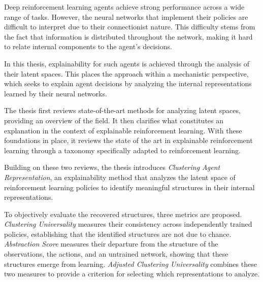 \cleartorightpage
\ifprintversion\hbox{}\thispagestyle{empty}\newpage\fi
\centeredmargins
{}
\thispagestyle{empty}
\nolinenumbers
\label{chap:abstract}
\begin{center}
  {\LARGE\bfseries \ThesisTitle\par}
  \medskip
  {\large \ThesisAuthor\par}
\end{center}
\bigskip

Deep reinforcement learning agents achieve strong performance across a wide range of tasks.
However, the neural networks that implement their policies are difficult to interpret due to their connectionist nature.
This difficulty stems from the fact that information is distributed throughout the network, making it hard to relate internal components to the agent's decisions.

In this thesis, explainability for such agents is achieved through the analysis of their latent spaces.
This places the approach within a mechanistic perspective, which seeks to explain agent decisions by analyzing the internal representations learned by their neural networks.

The thesis first reviews state-of-the-art methods for analyzing latent spaces, providing an overview of the field.
It then clarifies what constitutes an explanation in the context of explainable reinforcement learning.
With these foundations in place, it reviews the state of the art in explainable reinforcement learning through a taxonomy specifically adapted to reinforcement learning.

Building on these two reviews, the thesis introduces \textit{Clustering Agent Representation}, an explainability method that analyzes the latent space of reinforcement learning policies to identify meaningful structures in their internal representations.

To objectively evaluate the recovered structures, three metrics are proposed.
\textit{Clustering Universality} measures their consistency across independently trained policies, establishing that the identified structures are not due to chance.
\textit{Abstraction Score} measures their departure from the structure of the observations, the actions, and an untrained network, showing that these structures emerge from learning.
\textit{Adjusted Clustering Universality} combines these two measures to provide a criterion for selecting which representations to analyze.

